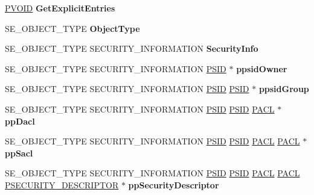 \begin{DoxyCompactItemize}
\hyperlink{interfacevoid}{P\+V\+O\+ID} {\bfseries Get\+Explicit\+Entries}
\item 
\mbox{\label{struct___n_t_m_a_r_t_a_a4bac12c706ac95dbc2c2ab48baa1e000}} 
S\+E\+\_\+\+O\+B\+J\+E\+C\+T\+\_\+\+T\+Y\+PE {\bfseries Object\+Type}
\item 
\mbox{\label{struct___n_t_m_a_r_t_a_abedfb997d751f157aa7e9ca2d06fdb97}} 
S\+E\+\_\+\+O\+B\+J\+E\+C\+T\+\_\+\+T\+Y\+PE S\+E\+C\+U\+R\+I\+T\+Y\+\_\+\+I\+N\+F\+O\+R\+M\+A\+T\+I\+ON {\bfseries Security\+Info}
\item 
\mbox{\label{struct___n_t_m_a_r_t_a_a2543186fd4dfccaccb92056e2427ed04}} 
S\+E\+\_\+\+O\+B\+J\+E\+C\+T\+\_\+\+T\+Y\+PE S\+E\+C\+U\+R\+I\+T\+Y\+\_\+\+I\+N\+F\+O\+R\+M\+A\+T\+I\+ON \hyperlink{struct___s_i_d}{P\+S\+ID} $\ast$ {\bfseries ppsid\+Owner}
\item 
\mbox{\label{struct___n_t_m_a_r_t_a_a97fe031366d3fcfef0b67a33e8bf6bd7}} 
S\+E\+\_\+\+O\+B\+J\+E\+C\+T\+\_\+\+T\+Y\+PE S\+E\+C\+U\+R\+I\+T\+Y\+\_\+\+I\+N\+F\+O\+R\+M\+A\+T\+I\+ON \hyperlink{struct___s_i_d}{P\+S\+ID} \hyperlink{struct___s_i_d}{P\+S\+ID} $\ast$ {\bfseries ppsid\+Group}
\item 
\mbox{\label{struct___n_t_m_a_r_t_a_ac5391d4b74b7306e0c95551a75cf53ea}} 
S\+E\+\_\+\+O\+B\+J\+E\+C\+T\+\_\+\+T\+Y\+PE S\+E\+C\+U\+R\+I\+T\+Y\+\_\+\+I\+N\+F\+O\+R\+M\+A\+T\+I\+ON \hyperlink{struct___s_i_d}{P\+S\+ID} \hyperlink{struct___s_i_d}{P\+S\+ID} \hyperlink{struct___a_c_l}{P\+A\+CL} $\ast$ {\bfseries pp\+Dacl}
\item 
\mbox{\label{struct___n_t_m_a_r_t_a_a5715bee87fe3860b328fcb2d85b2fff5}} 
S\+E\+\_\+\+O\+B\+J\+E\+C\+T\+\_\+\+T\+Y\+PE S\+E\+C\+U\+R\+I\+T\+Y\+\_\+\+I\+N\+F\+O\+R\+M\+A\+T\+I\+ON \hyperlink{struct___s_i_d}{P\+S\+ID} \hyperlink{struct___s_i_d}{P\+S\+ID} \hyperlink{struct___a_c_l}{P\+A\+CL} \hyperlink{struct___a_c_l}{P\+A\+CL} $\ast$ {\bfseries pp\+Sacl}
\item 
\mbox{\label{struct___n_t_m_a_r_t_a_acc3296d9eafa7ca5f34ce33747467a94}} 
S\+E\+\_\+\+O\+B\+J\+E\+C\+T\+\_\+\+T\+Y\+PE S\+E\+C\+U\+R\+I\+T\+Y\+\_\+\+I\+N\+F\+O\+R\+M\+A\+T\+I\+ON \hyperlink{struct___s_i_d}{P\+S\+ID} \hyperlink{struct___s_i_d}{P\+S\+ID} \hyperlink{struct___a_c_l}{P\+A\+CL} \hyperlink{struct___a_c_l}{P\+A\+CL} \hyperlink{struct___s_e_c_u_r_i_t_y___d_e_s_c_r_i_p_t_o_r}{P\+S\+E\+C\+U\+R\+I\+T\+Y\+\_\+\+D\+E\+S\+C\+R\+I\+P\+T\+OR} $\ast$ {\bfseries pp\+Security\+Descriptor}

\end{DoxyCompactItemize}
